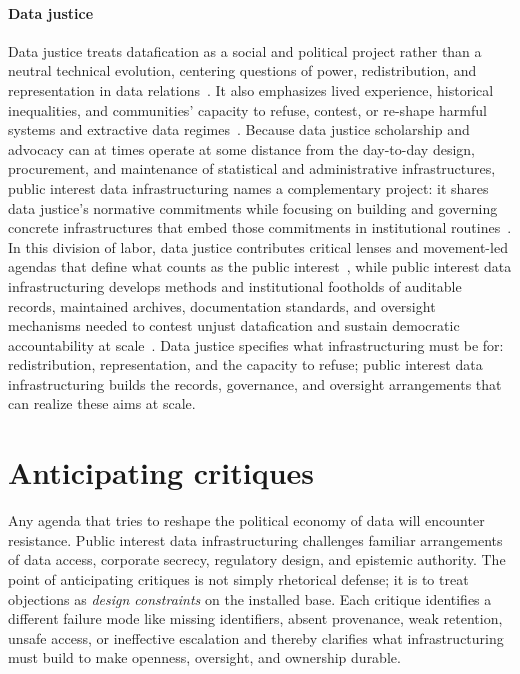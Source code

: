 \documentclass[acmsmall,screen]{acmart}
\begin{document}
\paragraph*{Data justice}
Data justice treats datafication as a social and political project rather than a neutral technical evolution, centering questions of power, redistribution, and representation in data relations~\cite{taylorWhatDataJustice2017,dignazioDataFeminism2020,braunDataJusticeData2022}. It also emphasizes lived experience, historical inequalities, and communities' capacity to refuse, contest, or re-shape harmful systems and extractive data regimes~\cite{zongDataRefusalFramework2024,garciaNoReimaginingData2022,dencikRescuingDataJustice2025}. Because data justice scholarship and advocacy can at times operate at some distance from the day-to-day design, procurement, and maintenance of statistical and administrative infrastructures, public interest data infrastructuring names a complementary project: it shares data justice's normative commitments while focusing on building and governing concrete infrastructures that embed those commitments in institutional routines~\cite{taylorWhatDataJustice2017,acker_DataCraftTheory_2019,hutchinsonAccountabilityMachineLearning2021}. In this division of labor, data justice contributes critical lenses and movement-led agendas that define what counts as the public interest~\cite{dignazioDataFeminism2020,braunDataJusticeData2022}, while public interest data infrastructuring develops methods and institutional footholds of auditable records, maintained archives, documentation standards, and oversight mechanisms needed to contest unjust datafication and sustain democratic accountability at scale~\cite{schwartz_archives_2002,acker_DataCraftTheory_2019,hutchinsonAccountabilityMachineLearning2021}. Data justice specifies what infrastructuring must be for: redistribution, representation, and the capacity to refuse; public interest data infrastructuring builds the records, governance, and oversight arrangements that can realize these aims at scale.

\section*{Anticipating critiques}

Any agenda that tries to reshape the political economy of data will encounter resistance. Public interest data infrastructuring challenges familiar arrangements of data access, corporate secrecy, regulatory design, and epistemic authority. The point of anticipating critiques is not simply rhetorical defense; it is to treat objections as \emph{design constraints} on the installed base. Each critique identifies a different failure mode like missing identifiers, absent provenance, weak retention, unsafe access, or ineffective escalation and thereby clarifies what infrastructuring must build to make openness, oversight, and ownership durable.
\end{document}
